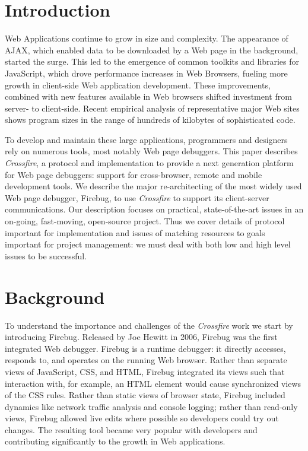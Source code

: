 
\section{Introduction}
Web Applications continue to grow in size and complexity. The
appearance of AJAX, which enabled data to be downloaded by a Web page
in the background, started the surge. This led to the emergence of common
toolkits and libraries for JavaScript, which drove  performance increases in Web Browsers, fueling more growth in client-side Web application development.
These improvements, combined with new features available in Web browsers shifted
investment from server- to client-side. Recent empirical analysis of
representative
 major Web sites shows program sizes in the range of hundreds of kilobytes of
sophisticated code\cite{VitekDynamicJS2010}.

To develop and maintain these large applications, programmers and designers rely
on numerous tools, most notably Web page debuggers. This paper describes
\textit{Crossfire}, a protocol and implementation to provide a next generation
platform for Web page debuggers: support for cross-browser, remote and mobile 
development tools. We describe the major re-architecting of the most widely used Web
page debugger, Firebug, to use \textit{Crossfire} to support its client-server
communications. Our description focuses on practical, state-of-the-art issues in
an on-going, fast-moving, open-source project. Thus we cover details of protocol
important for implementation and issues of matching resources to goals important
for project management: we must deal with both low and high level issues to
be successful.

\section{Background}
To understand the importance and challenges of the \textit{Crossfire} work we
start by introducing Firebug. Released by Joe Hewitt in 2006, Firebug was the
first integrated Web debugger. Firebug is a runtime debugger: it directly
accesses, responds to, and operates on the running Web browser.  Rather than
separate views of JavaScript, CSS, and HTML, Firebug integrated its views such
that interaction with, for example, an HTML element would cause synchronized
views of the CSS rules. Rather than static
 views of browser state, Firebug included dynamics like network traffic analysis
 and console logging; rather
than read-only views, Firebug allowed live edits where possible so developers
could try out changes. The resulting tool became very popular with developers
and contributing significantly to the growth in Web applications.

